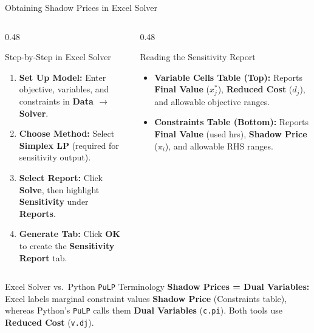 \documentclass{beamer}
\begin{document}
\begin{frame}{Obtaining Shadow Prices in Excel Solver}
\begin{columns}[T]
\begin{column}{0.48\textwidth}
\begin{block}{Step-by-Step in Excel Solver}
\footnotesize
\begin{enumerate}\setlength{\itemsep}{0.1em}
  \item \textbf{Set Up Model:} Enter objective, variables, and constraints in \textbf{Data $\rightarrow$ Solver}.
  \item \textbf{Choose Method:} Select \textbf{Simplex LP} (required for sensitivity output).
  \item \textbf{Select Report:} Click \textbf{Solve}, then highlight \textbf{Sensitivity} under \textbf{Reports}.
  \item \textbf{Generate Tab:} Click \textbf{OK} to create the \textbf{Sensitivity Report} tab.
\end{enumerate}
\end{block}
\end{column}

\begin{column}{0.48\textwidth}
\begin{block}{Reading the Sensitivity Report}
\footnotesize
\begin{itemize}\setlength{\itemsep}{0.2em}
  \item \textbf{Variable Cells Table (Top):} Reports \textbf{Final Value} ($x_j^*$), \textbf{Reduced Cost} ($d_j$), and allowable objective ranges.
  \item \textbf{Constraints Table (Bottom):} Reports \textbf{Final Value} (used hrs), \textbf{Shadow Price} ($\pi_i$), and allowable RHS ranges.
\end{itemize}
\end{block}
\end{column}
\end{columns}

\vspace{0.1em}
\begin{exampleblock}{Excel Solver vs.\ Python \texttt{PuLP} Terminology}
\footnotesize
\textbf{Shadow Prices = Dual Variables:} Excel labels marginal constraint values \textbf{Shadow Price} (Constraints table), whereas Python's \texttt{PuLP} calls them \textbf{Dual Variables} (\texttt{c.pi}). Both tools use \textbf{Reduced Cost} (\texttt{v.dj}).
\end{exampleblock}
\end{frame}
\end{document}
